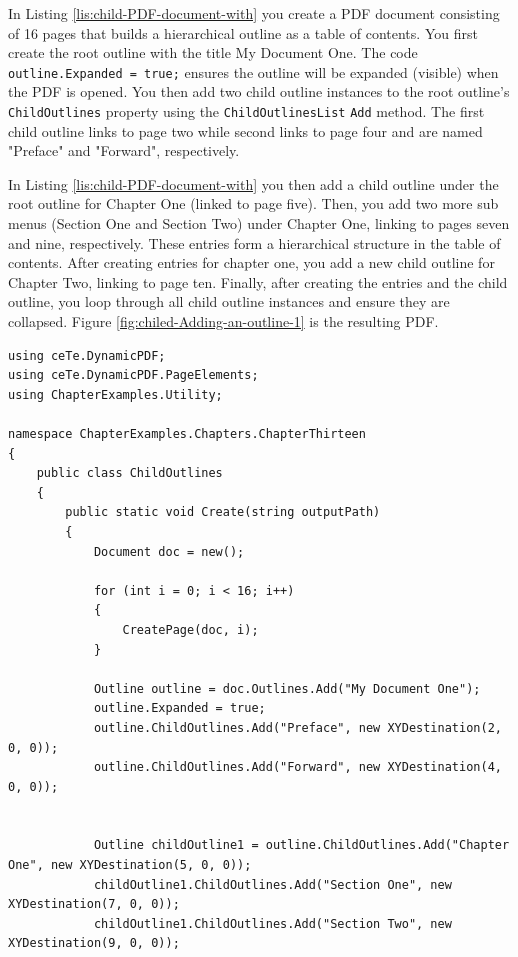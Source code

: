 \documentclass[american,letterpaper]{tufte-book}
\numberwithin{equation}{section}
\numberwithin{figure}{section}
\begin{document}
{In Listing \ref{lis:child-PDF-document-with} you create a PDF document
consisting of 16 pages that builds a hierarchical outline as a table
of contents. You first create the root outline with the title \textquotedbl My
Document One\textquotedbl . The code \texttt{outline.Expanded = true;}
ensures the outline will be expanded (visible) when the PDF is opened.
You then add two child outline instances to the root outline's \texttt{ChildOutlines}
property using the \texttt{ChildOutlinesList} \texttt{Add} method.
The first child outline links to page two while second links to page
four and are named "Preface" and "Forward", respectively.

In Listing \ref{lis:child-PDF-document-with} you then add a child
outline under the root outline for Chapter One (linked to page five).
Then, you add two more sub menus (Section One and Section Two) under
Chapter One, linking to pages seven and nine, respectively. These
entries form a hierarchical structure in the table of contents. After
creating entries for chapter one, you add a new child outline for Chapter
Two, linking to page ten. Finally, after creating the entries and the child outline, you loop through all child outline
instances and ensure they are collapsed. Figure \ref{fig:chiled-Adding-an-outline-1}
is the resulting PDF.
\bgroup{}
\begin{lstlisting}[caption={PDF document with child outlines.},label={lis:child-PDF-document-with},basicstyle={\small\ttfamily},breaklines=true]
using ceTe.DynamicPDF;
using ceTe.DynamicPDF.PageElements;
using ChapterExamples.Utility;

namespace ChapterExamples.Chapters.ChapterThirteen
{
    public class ChildOutlines
    {
        public static void Create(string outputPath)
        {
            Document doc = new();

            for (int i = 0; i < 16; i++)
            {
                CreatePage(doc, i);
            }

            Outline outline = doc.Outlines.Add("My Document One");
            outline.Expanded = true;
            outline.ChildOutlines.Add("Preface", new XYDestination(2, 0, 0));
            outline.ChildOutlines.Add("Forward", new XYDestination(4, 0, 0));


            Outline childOutline1 = outline.ChildOutlines.Add("Chapter One", new XYDestination(5, 0, 0));
            childOutline1.ChildOutlines.Add("Section One", new XYDestination(7, 0, 0));
            childOutline1.ChildOutlines.Add("Section Two", new XYDestination(9, 0, 0));


\end{lstlisting}}
\end{document}
